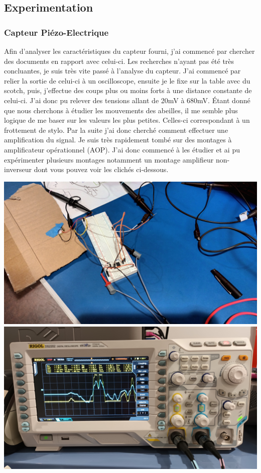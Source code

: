 \documentclass[12pt,french,a4paper]{article}
\begin{document}
\subsection{Experimentation}

\subsubsection{Capteur Piézo-Electrique}

Afin d'analyser les caractéristiques du capteur fourni, j'ai commencé par chercher des documents en rapport avec celui-ci. Les recherches n'ayant pas 
été très concluantes, je suis très vite passé à l'analyse du capteur. J'ai commencé par relier la sortie de celui-ci à un oscilloscope, ensuite je le fixe
sur la table avec du scotch, puis, j'effectue des coups plus ou moins forts à une distance constante de celui-ci. J'ai donc pu relever des tensions allant de 20mV à 680mV.
Étant donné que nous cherchons à étudier les mouvements des abeilles, il me semble plus logique de me baser sur les valeurs les plus petites. Celles-ci correspondant à un frottement de stylo.
Par la suite j'ai donc cherché comment effectuer une amplification du signal. Je suis très rapidement tombé sur des montages à amplificateur opérationnel (AOP). J'ai donc commencé
à les étudier et ai pu expérimenter plusieurs montages notamment un montage amplifieur non-inverseur dont vous pouvez voir les clichés ci-dessous.
\begin{center}	
	\includegraphics[scale=0.08]{../img/montage_piezo_aop.jpg}
	\label{image3}
	\includegraphics[scale=0.08]{../img/sortie_osciloscope.jpg}
	\label{image4}
\end{center}
\end{document}
